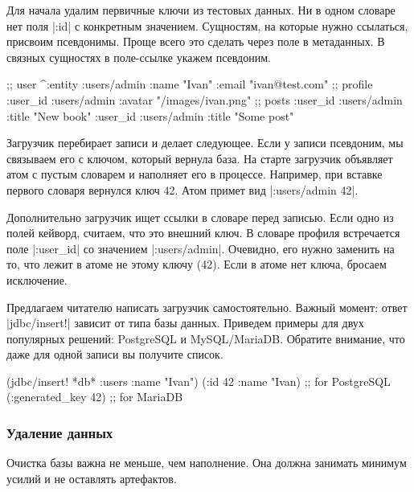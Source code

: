 Для начала удалим первичные ключи из тестовых данных. Ни в одном словаре нет
поля \spverb|:id| с конкретным значением. Сущностям, на которые нужно ссылаться,
присвоим псевдонимы. Проще всего это сделать через поле в метаданных. В связных
сущностях в поле-ссылке укажем псевдоним.

\begin{english}
  \begin{clojure}
;; user
^{:entity :users/admin} {:name "Ivan" :email "ivan@test.com"}
;; profile
{:user_id :users/admin :avatar "/images/ivan.png"}
;; posts
{:user_id :users/admin :title "New book"}
{:user_id :users/admin :title "Some post"}
  \end{clojure}
\end{english}

Загрузчик перебирает записи и делает следующее. Если у записи псевдоним, мы
связываем его с ключом, который вернула база. На старте загрузчик объявляет атом
с пустым словарем и наполняет его в процессе. Например, при вставке первого
словаря вернулся ключ 42. Атом примет вид \spverb|{:users/admin 42}|.

Дополнительно загрузчик ищет ссылки в словаре перед записью. Если одно из полей
кейворд, считаем, что это внешний ключ. В словаре профиля встречается поле
\spverb|:user_id| со значением \spverb|:users/admin|. Очевидно, его нужно
заменить на то, что лежит в атоме не этому ключу (42). Если в атоме нет ключа,
бросаем исключение.

Предлагаем читателю написать загрузчик самостоятельно. Важный момент: ответ
\spverb|jdbc/insert!| зависит от типа базы данных. Приведем примеры для двух
популярных решений: PostgreSQL и MySQL/MariaDB. Обратите внимание, что даже для
одной записи вы получите список.

\begin{english}
  \begin{clojure}
(jdbc/insert! *db* :users {:name "Ivan"})
({:id 42 :name "Ivan}) ;; for PostgreSQL
({:generated_key 42})  ;; for MariaDB
  \end{clojure}
\end{english}

\subsubsection*{Удаление данных}

Очистка базы важна не меньше, чем наполнение. Она должна занимать минимум усилий
и не оставлять артефактов.


